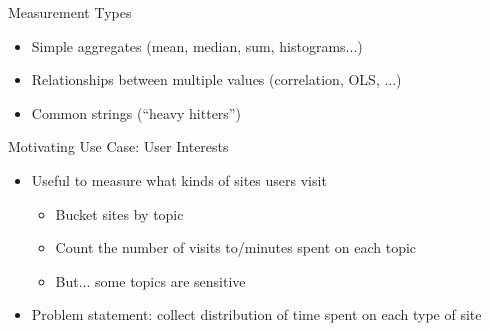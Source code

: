 \documentclass[helvetica]{beamer}
\begin{document}
\begin{frame}{Measurement Types}
  \begin{itemize}
  \item Simple aggregates (mean, median, sum, histograms...)
  \item Relationships between multiple values (correlation, OLS, ...)
  \item Common strings (``heavy hitters'')    
  \end{itemize}
\end{frame}

\begin{frame}{Motivating Use Case: User Interests}

  \begin{itemize}
  \item Useful to measure what kinds of sites users visit
    \begin{itemize}
    \item Bucket sites by topic
    \item Count the number of visits to/minutes spent on each topic
    \item But... some topics are sensitive
    \end{itemize}
    
  \item Problem statement: collect distribution of time spent on each type of site
  \end{itemize}
\end{frame}
\end{document}
